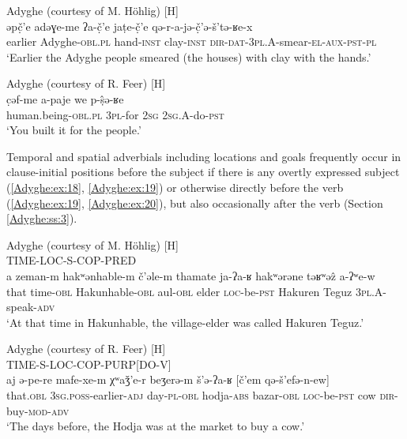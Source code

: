 \documentclass[output=paper,colorlinks,citecolor=brown, draft]{langscibook}
\begin{document}
\ea\label{Adyghe:ex:16}
Adyghe (courtesy of M. Höhlig) [H] \\
\gll əpč̣'e adəɣe-me ʔa-č̣'e jaṭe-č̣'e qə-r-a-jə-č̣'ə-š'tə-ʁe-x \\
earlier Adyghe\textsc{-obl.pl} hand\textsc{-inst} clay\textsc{-inst} \textsc{dir-dat-3pl.A-}smear\textsc{-el-aux-pst-pl} \\
 `Earlier the Adyghe people smeared (the houses) with clay with the hands.' 
\z

\ea\label{Adyghe:ex:17}
Adyghe (courtesy of R. Feer) [H] \\
\gll c̣əf-me a-paje we p-ṣ̂ə-ʁe \\
human.being\textsc{-obl.pl} \textsc{3pl-}for \textsc{2sg} \textsc{2sg.A-}do\textsc{-pst} \\
\glt `You built it for the people.' 
\z

Temporal and spatial adverbials including locations and goals frequently occur in clause-initial positions before the subject if there is any overtly expressed subject (\ref{Adyghe:ex:18}, \ref{Adyghe:ex:19}) or otherwise directly before the verb (\ref{Adyghe:ex:19}, \ref{Adyghe:ex:20}), but also occasionally after the verb (Section \ref{Adyghe:ss:3}).

\ea\label{Adyghe:ex:18} 
Adyghe (courtesy of M. Höhlig) [H] \\
TIME-LOC-S-COP-PRED \\
\gll a zeman-m hakʷənhable-m č'əle-m thamate ja-ʔa-ʁ hakʷərəne təʁʷəẑ a-ʔʷe-w \\
that time\textsc{-obl} Hakunhable\textsc{-obl} aul\textsc{-obl} elder \textsc{loc-}be\textsc{-pst} Hakuren Teguz \textsc{3pl.A-}speak\textsc{-adv} \\
\glt `At that time in Hakunhable, the village-elder was called Hakuren Teguz.'
\z

\ea\label{Adyghe:ex:19}
Adyghe (courtesy of R. Feer) [H] \\
TIME-S-LOC-COP-PURP[DO-V] \\
\gll aj ə-pe-re mafe-xe-m χʷaǯ'e-r beʒerə-m š'ə-ʔa-ʁ [č'em qə-š'efə-n-ew] \\
that\textsc{.obl} \textsc{3sg.}\textsc{poss-}earlier\textsc{-adj} day\textsc{-pl}\textsc{-obl} hodja\textsc{-abs} bazar\textsc{-obl} \textsc{loc-}be\textsc{-pst} cow \textsc{dir-}buy\textsc{-mod}\textsc{-adv} \\
\glt `The days before, the Hodja was at the market to buy a cow.' 
\z
 
\end{document}
